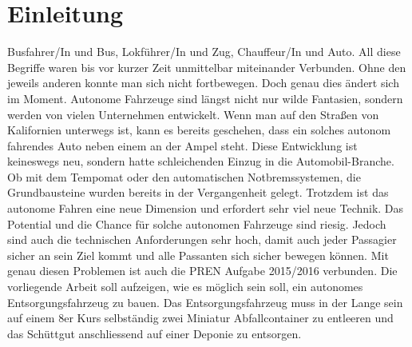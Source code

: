 \section{Einleitung}
Busfahrer/In und Bus, Lokführer/In und Zug, Chauffeur/In und Auto. All diese Begriffe waren bis vor kurzer Zeit unmittelbar miteinander Verbunden. Ohne den jeweils anderen konnte man sich nicht fortbewegen. Doch genau dies ändert sich im Moment. Autonome Fahrzeuge sind längst nicht nur wilde Fantasien, sondern werden von vielen Unternehmen entwickelt. Wenn man auf den Straßen von Kalifornien unterwegs ist, kann es bereits geschehen, dass ein solches autonom fahrendes Auto neben einem an der Ampel steht. Diese Entwicklung ist keineswegs neu, sondern hatte schleichenden Einzug in die Automobil-Branche. Ob mit dem Tempomat oder den automatischen Notbremssystemen, die Grundbausteine wurden bereits in der Vergangenheit gelegt.
Trotzdem ist das autonome Fahren eine neue Dimension und erfordert sehr viel neue Technik. Das Potential und die Chance für solche autonomen Fahrzeuge sind riesig. Jedoch sind auch die technischen Anforderungen sehr hoch, damit auch jeder Passagier sicher an sein Ziel kommt und alle Passanten sich sicher bewegen können. 
Mit genau diesen Problemen ist auch die PREN Aufgabe 2015/2016 verbunden. Die vorliegende Arbeit soll aufzeigen, wie es möglich sein soll, ein autonomes Entsorgungsfahrzeug zu bauen. Das Entsorgungsfahrzeug muss in der Lange sein auf einem 8er Kurs selbständig zwei Miniatur Abfallcontainer zu entleeren und das Schüttgut anschliessend auf einer Deponie zu entsorgen. 
